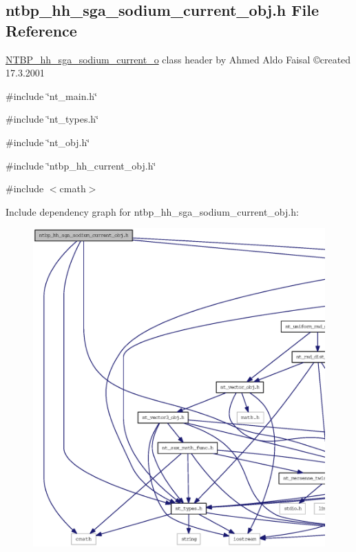 \subsection{ntbp\_\-hh\_\-sga\_\-sodium\_\-current\_\-obj.h File Reference}
\label{ntbp__hh__sga__sodium__current__obj_8h}



\begin{DoxyItemize}
\item \hyperlink{class_n_t_b_p__hh__sga__sodium__current__o}{NTBP\_\-hh\_\-sga\_\-sodium\_\-current\_\-o} class header by Ahmed Aldo Faisal \copyright created 17.3.2001 
\end{DoxyItemize} 


{\ttfamily \#include \char`\"{}nt\_\-main.h\char`\"{}}\par
{\ttfamily \#include \char`\"{}nt\_\-types.h\char`\"{}}\par
{\ttfamily \#include \char`\"{}nt\_\-obj.h\char`\"{}}\par
{\ttfamily \#include \char`\"{}ntbp\_\-hh\_\-current\_\-obj.h\char`\"{}}\par
{\ttfamily \#include $<$cmath$>$}\par
Include dependency graph for ntbp\_\-hh\_\-sga\_\-sodium\_\-current\_\-obj.h:
\nopagebreak
\begin{figure}[H]
\begin{center}
\leavevmode
\includegraphics[width=400pt]{ntbp__hh__sga__sodium__current__obj_8h__incl}
\end{center}
\end{figure}
